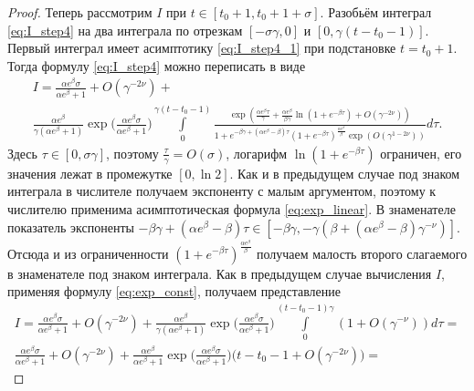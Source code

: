 \begin{proof}
Теперь рассмотрим $I$ при $t \in [t_0 + 1, t_0 + 1 + \sigma]$. Разобьём интеграл \eqref{eq:I_step4} на два интеграла по отрезкам $[-\sigma\gamma, 0]$ и  $[0, \gamma (t - t_0 - 1)]$. Первый интеграл имеет асимптотику \eqref{eq:I_step4_1} при подстановке $t = t_0 + 1$. Тогда формулу \eqref{eq:I_step4} можно переписать в виде
\small
\begin{multline}
	\label{eq:I_step4_2}
	I=\frac{\alpha e^\beta\sigma}{\alpha e^\beta+1}+O(\gamma^{-2\nu})+
	\\
	\frac{\alpha e^\beta}{\gamma(\alpha e^{\beta}+1)}\exp\Big(\frac{\alpha e^{\beta}\sigma}{\alpha e^\beta+1}\Big)
	\int\limits_{0}^{\gamma(t - t_0 - 1)}\frac{\exp( \frac{\alpha e^\beta\tau}{\gamma}+\frac{\alpha e^\beta}{\beta\gamma}\ln(1+e^{-\beta\tau}) +O(\gamma^{-2\nu}))}{1+e^{-\beta\gamma+(\alpha e^\beta-\beta)\tau}(1+e^{-\beta\tau})^\frac{\alpha e^\beta}{\beta}\exp(O(\gamma^{1 - 2\nu}))}d\tau.
\end{multline}
\normalsize
Здесь $\tau \in [0,\sigma\gamma]$, поэтому $\frac{\tau}{\gamma} = O(\sigma)$, логарифм $\ln(1 + e^{-\beta\tau})$ ограничен, его значения лежат в промежутке $[0,\ln 2]$. Как и в предыдущем случае под знаком интеграла в числителе получаем экспоненту с малым аргументом, поэтому к числителю применима асимптотическая формула \eqref{eq:exp_linear}. В знаменателе показатель экспоненты $-\beta\gamma + (\alpha e^\beta - \beta) \tau \in [-\beta\gamma, -\gamma(\beta + (\alpha e^\beta - \beta) \gamma^{-\nu})]$. Отсюда и из ограниченности $(1 + e^{-\beta\tau})^\frac{\alpha e^\beta}{\beta}$ получаем малость второго слагаемого в знаменателе под знаком интеграла. Как в предыдущем случае вычисления $I$, применяя формулу \eqref{eq:exp_const}, получаем представление
%
\small
\begin{multline}
	\label{eq:I_step4_2}
	I=\frac{\alpha e^\beta\sigma}{\alpha e^\beta+1}+O(\gamma^{-2\nu})+
	\frac{\alpha e^\beta}{\gamma(\alpha e^{\beta}+1)}\exp\Big(\frac{\alpha e^{\beta}\sigma}{\alpha e^\beta+1}\Big)
	\int\limits_{0}^{(t-t_0-1)\gamma}(1+O(\gamma^{-\nu}))d\tau=
	\\
	\frac{\alpha e^\beta\sigma}{\alpha e^\beta+1}+O(\gamma^{-2\nu})+
	\frac{\alpha e^\beta}{\alpha e^{\beta}+1}\exp\Big(\frac{\alpha e^{\beta}\sigma}{\alpha e^\beta+1}\Big)\big(
	t-t_0-1+O(\gamma^{-2\nu})\big)=

\end{multline}
\end{proof}
